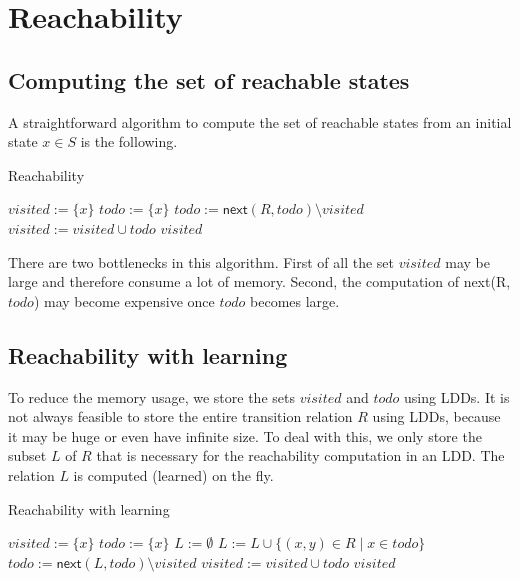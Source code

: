 \documentclass{article}
\newcommand{\var}[1]{\ensuremath{\textit{#1}}}
\begin{document}
\newpage
\section{Reachability}

\subsection{Computing the set of reachable states}
A straightforward algorithm to compute the set of reachable states from an initial state
$x \in S$ is the following.

\begin{algorithm}[ht]
\caption{Reachability}
\label{alg:reachability}
\begin{algorithmic}[1]
\State $\var{visited} := \{ x \}$
\State $\var{todo} := \{ x \}$
\While {$\var{todo} \neq \emptyset$}
    \State $\var{todo} := \textsf{next}(R, \var{todo}) \setminus \var{visited}$
    \State $\var{visited} := \var{visited} \cup \var{todo}$
\EndWhile
\State \Return \var{visited}
\EndFunction
\end{algorithmic}
\end{algorithm}

\noindent
There are two bottlenecks in this algorithm. First of all the set \var{visited} may be large and therefore consume a lot of memory. Second, the computation of \textsf{next}(R, \var{todo}) may become 
expensive once \var{todo} becomes large.

\subsection{Reachability with learning}
To reduce the memory usage, we store the sets $visited$ and $todo$ using LDDs. It is not always feasible to store the entire transition relation $R$ using LDDs, because it may be huge or even have infinite size. To deal with this, we only store the subset $L$ of $R$ that is necessary for the reachability computation in an LDD. The relation $L$ is computed (learned) on the fly.

\begin{algorithm}[ht]
\caption{Reachability with learning}
\label{alg:reachability_with_learning}
\begin{algorithmic}[1]
\State $\var{visited} := \{ x \}$
\State $\var{todo} := \{ x \}$
\State $L := \emptyset$ 
\While {$\var{todo} \neq \emptyset$}
    \State $L := L \cup \{ (x,y) \in R \mid x \in \var{todo} \} $ 
    \State $\var{todo} := \textsf{next}(L, \var{todo}) \setminus \var{visited}$ 
    \State $\var{visited} := \var{visited} \cup \var{todo}$
\EndWhile
\State \Return \var{visited}
\EndFunction
\end{algorithmic}
\end{algorithm}
\end{document}

